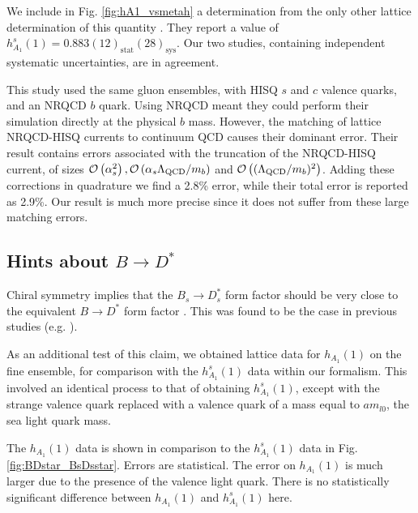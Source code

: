 We include in Fig. \ref{fig:hA1_vsmetah} a determination from the only other lattice determination of this quantity \cite{Harrison:2017fmw}. They report a value of $h_{A_1}^s(1) = 0.883(12)_{\text{stat}}(28)_{\text{sys}}$. Our two studies, containing independent systematic uncertainties, are in agreement.

This study used the same gluon ensembles, with HISQ $s$ and $c$ valence quarks, and an NRQCD $b$ quark. Using NRQCD meant they could perform their simulation directly at the physical $b$ mass. However, the matching of lattice NRQCD-HISQ currents to continuum QCD causes their dominant error. Their result contains errors associated with the truncation of the NRQCD-HISQ current, of sizes $\mathcal{O}\left( \alpha_s^2 \right),\mathcal{O}\left( \alpha_s \Lambda_{\text{QCD}}/m_b \right)$ and $\mathcal{O}\left( (\Lambda_{\text{QCD}}/m_b)^2 \right)$. Adding these corrections in quadrature we find a 2.8\% error, while their total error is reported as 2.9\%. Our result is much more precise since it does not suffer from these large matching errors.

\subsection{Hints about $B\to D^*$}

Chiral symmetry implies that the $B_s\to D_s^*$ form factor should be very close to the equivalent $B\to D^*$ form factor \cite{Laiho:2005ue}. This was found to be the case in previous studies (e.g. \cite{Harrison:2017fmw}). 

As an additional test of this claim, we obtained lattice data for $h_{A_1}(1)$ on the fine ensemble, for comparison with the $h_{A_1}^s(1)$ data within our formalism. This involved an identical process to that of obtaining $h_{A_1}^s(1)$, except with the strange valence quark replaced with a valence quark of a mass equal to $am_{l0}$, the sea light quark mass.

The $h_{A_1}(1)$ data is shown in comparison to the $h_{A_1}^s(1)$ data in Fig. \ref{fig:BDstar_BsDsstar}. Errors are statistical. The error on $h_{A_1}(1)$ is much larger due to the presence of the valence light quark. There is no statistically significant difference between $h_{A_1}(1)$ and $h_{A_1}^s(1)$ here.

